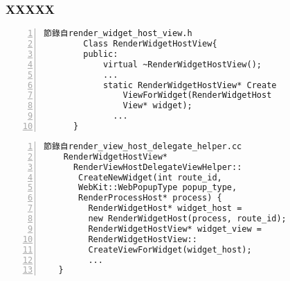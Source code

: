 \documentclass[utf8x]{beamer}
\begin{document}
\begin{frame}[fragile,t]%
\frametitle{XXXXX}
\begin{table}[h]
\begin{center}
\begin{minipage}{72mm}
\linespread{0.8}
\fontsize{8pt}{6pt}\selectfont
\begin{Verbatim}[numbers=left,framesep=1mm,numbersep=1pt]
	節錄自render_widget_host_view.h
	    Class RenderWidgetHostView{
	    public:
	        virtual ~RenderWidgetHostView();
	        ...
	        static RenderWidgetHostView* Create
	            ViewForWidget(RenderWidgetHost
	            View* widget);
	          ...
	  }
\end{Verbatim}
\end{minipage}
\end{center}
\end{table}
\begin{table}[h]
\begin{center}
\begin{minipage}{72mm}
\linespread{0.8}
\fontsize{8pt}{6pt}\selectfont
\begin{Verbatim}[numbers=left,framesep=1mm,numbersep=1pt]
節錄自render_view_host_delegate_helper.cc
    RenderWidgetHostView*
      RenderViewHostDelegateViewHelper::
       CreateNewWidget(int route_id,
       WebKit::WebPopupType popup_type,
       RenderProcessHost* process) {
         RenderWidgetHost* widget_host =
         new RenderWidgetHost(process, route_id);
         RenderWidgetHostView* widget_view =
         RenderWidgetHostView::
         CreateViewForWidget(widget_host);
         ...
   }
\end{Verbatim}
\end{minipage}
\end{center}
\end{table}
\end{frame}
\end{document}

